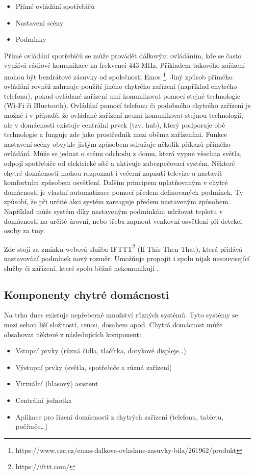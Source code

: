\begin{itemize}
\item Přímé ovládání spotřebičů
\item Nastavení scény
\item Podmínky \cite{CoJeSmartHomeHub}
\end{itemize}
Přímé ovládání spotřebičů se může provádět dálkovým ovládáním, kde se často využívá rádiové komunikace na frekvenci 443 MHz. Příkladem takového zařízení mohou být bezdrátové zásuvky od společnosti Emos \footnote{https://www.czc.cz/emos-dalkove-ovladane-zasuvky-bila/261962/produkt}.
Jiný způsob přímého ovládání rovněž zahrnuje použití jiného chytrého zařízení (například chytrého telefonu), pokud ovládané zařízení umí komunikovat pomocí stejné technologie (Wi-Fi či Bluetooth). Ovládání pomocí telefonu či podobného chytrého zařízení je možné i v případě, že ovládané zařízení neumí komunikovat stejnou technologií, ale v domácnosti existuje centrální prvek (tzv. hub), který podporuje obě technologie a funguje zde jako prostředník mezi oběma zařízeními. 
Funkce nastavení scény obvykle jistým způsobem sdružuje několik příkazů přímého ovládání. Může se jednat o scénu odchodu z domu, která vypne všechna světla, odpojí spotřebiče od elektrické sítě a aktivuje zabezpečovací systém. Některé chytré domácnosti mohou rozpoznat i večerní zapnutí televize a nastavit komfortním způsobem osvětlení.
Dalším principem uplatňovaným v chytré domácnosti je vlastní automatizace pomocí předem definovaných podmínek. Ty způsobí, že při určité akci systém zareaguje předem nastaveným způsobem. Například může systém díky nastaveným podmínkám udržovat teplotu v domácnosti na určité úrovni, nebo třeba zapnout venkovní osvětlení při detekci osoby za tmy. 

Zde stojí za zmínku webová služba IFTTT\footnote{https://ifttt.com/} (If This Then That), která přidává nastavování podmínek nový rozměr. Umožňuje propojit i spolu nijak nesouvisející služby či zařízení, které spolu běžně nekomunikují \cite{IFTTT}.

\subsection*{Komponenty chytré domácnosti}
Na trhu dnes existuje nepřeberné množství různých systémů. Tyto systémy se mezi sebou liší složitostí, cenou, dosahem apod. Chytrá domácnost může obsahovat některé z následujících komponent:

\begin{itemize}
\item Vstupní prvky (různá čidla, tlačítka, dotykové displeje…)
\item Výstupní prvky (světla, spotřebiče a různá zařízení)
\item Virtuální (hlasový) asistent
\item Centrální jednotka
\item Aplikace pro řízení domácnosti z chytrých zařízení (telefonu, tabletu, počítače…)
\end{itemize}

